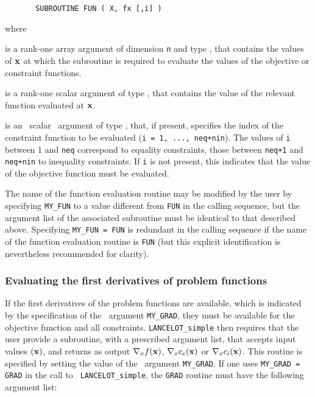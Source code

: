 \documentclass{galahad}
\begin{document}
\def\baselinestretch{0.8}
{\tt \begin{verbatim}
       SUBROUTINE FUN ( X, fx [,i] )
\end{verbatim} }\def\baselinestretch{1.0}
\noindent
where
\begin{description}
 is a rank-one \intentin array argument of
dimension {\tt n} and type \realdp,
that contains the values of ${\mathbf{x}}$ at which the
subroutine is required to evaluate the values
of the objective or constraint functions.

 is a rank-one \intentout scalar argument of
  type \realdp, that contains the value of the relevant
  function evaluated at ${\mathbf{x}}$.

 is an \optional\ scalar \intentin\ argument of type \integer,
that, if present, specifies the index of the constraint function to be
evaluated  ({\tt i = 1, ..., neq+nin}).  The values of {\tt i}
between 1 and {\tt neq} correspond to equality constraints, those between
{\tt neq+1} and {\tt neq+nin} to inequality constraints. If {\tt i} is not
present, this indicates that the value of the objective function must be
evaluated.
\end{description}

\noindent
The name of the function evaluation routine may be modified by the user
by specifying {\tt MY\_FUN} to a value different from {\tt FUN} in the calling
sequence, but the argument list of the associated subroutine must be identical
to that described above. Specifying  {\tt MY\_FUN = FUN} is redundant in the
calling sequence if the name of the function evaluation routine is {\tt FUN}
(but this explicit identification is nevertheless recommended for clarity).

\subsubsection{Evaluating the first derivatives of problem functions\label{pfg}}

If the first derivatives of the problem functions are available, which is
indicated by the specification of the \optional\ argument {\tt MY\_GRAD}, they
must be available for the objective function and all constraints.
{\tt LANCELOT\_simple} then requires that the user provide a subroutine, with
a  prescribed argument list, that accepts input values $({\mathbf{x}})$, and returns as
output  $\nabla_x f({\mathbf{x}})$,  $\nabla_x c_e({\mathbf{x}})$ or $\nabla_x c_i({\mathbf{x}})$.
This routine is specified by setting the value of the \optional\ argument
{\tt MY\_GRAD}. If one uses {\tt MY\_GRAD = GRAD} in the call to {\tt
  LANCELOT\_simple}, the {\tt GRAD} routine must have the following argument
list:
\end{document}
